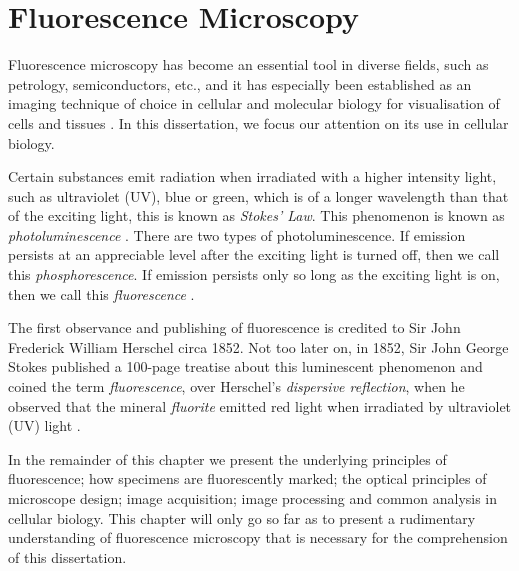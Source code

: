 
\chapter{Fluorescence Microscopy} %

\label{chap:Chapter2} %

Fluorescence microscopy has become an essential tool in diverse fields, such as petrology, semiconductors, etc., and it has especially been established as an imaging technique of choice in cellular and molecular biology for visualisation of cells and tissues \citep{Spring2003,Danek2012,Hubeny2008,Fatima2008,Matula2012}.
In this dissertation, we focus our attention on its use in cellular biology.

Certain substances emit radiation when irradiated with a higher intensity light, such as ultraviolet (UV), blue or green, which is of a longer wavelength than that of the exciting light, this is known as \textit{Stokes' Law}.
This phenomenon is known as \textit{photoluminescence} \citep{Vaughan2015,Sarder2006,AbramowitzDavidson2016}.
There are two types of photoluminescence. If emission persists at an appreciable level after the exciting light is turned off, then we call this \textit{phosphorescence}.
If emission persists only so long as the exciting light is on, then we call this \textit{fluorescence} \citep{Koch1972,SpringDavisdson2016}.

The first observance and publishing of fluorescence is credited to Sir John Frederick William Herschel circa 1852.
Not too later on, in 1852, Sir John George Stokes published a 100-page treatise about this luminescent phenomenon and coined the term \textit{fluorescence}, over Herschel's \textit{dispersive reflection}, when he observed that the mineral \textit{fluorite} emitted red light when irradiated by ultraviolet (UV) light \citep{Dobrucki2013,Danek2012}.

In the remainder of this chapter we present the underlying principles of fluorescence; how specimens are fluorescently marked; the optical principles of microscope design; image acquisition; image processing and common analysis in cellular biology.
This chapter will only go so far as to present a rudimentary understanding of fluorescence microscopy that is necessary for the comprehension of this dissertation.


